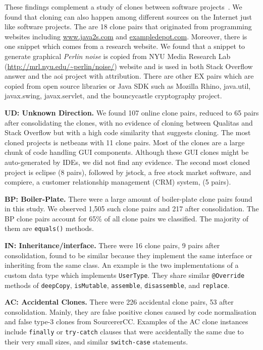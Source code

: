 \documentclass[10pt,journal,compsoc]{IEEEtran}
\begin{document}
These findings complement a study of clones between software
projects~\cite{Svajlenko2014}. We found that cloning can also happen among
different sources on the Internet just like software projects. The are 18 clone
pairs that originated from programming websites including \url{www.java2s.com}
and \url{exampledepot.com}. Moreover, there is one snippet which comes from a
research website. We found that a snippet to generate graphical \textit{Perlin
	noise} is copied from NYU Media Research Lab
(\url{http://mrl.nyu.edu/~perlin/noise/}) website and is used in both Stack Overflow
answer and the \textsf{aoi} project with attribution. There are other EX pairs which
are copied from open source libraries or Java SDK such as \textsf{Mozilla
	Rhino}, \textsf{java.util}, \textsf{javax.swing}, \textsf{javax.servlet}, and
the \textsf{bouncycastle} cryptography project.

\textbf{UD: Unknown Direction.} We found 107 online clone pairs, reduced to 65
pairs after consolidating the clones, with no evidence of cloning between Qualitas
and Stack Overflow but with a high code similarity that suggests cloning. 
The most cloned projects is \textsf{netbeans} with 11 clone pairs. Most of the
clones are a large chunk of code handling GUI components. Although these GUI
clones might be auto-generated by IDEs, we did not find any evidence. The second
most cloned project is \textsf{eclipse} (8 pairs), followed by \textsf{jstock},
a free stock market software, and \textsf{compiere}, a customer
relationship management (CRM) system, (5 pairs).

\textbf{BP: Boiler-Plate.} There were a large amount of boiler-plate clone pairs
found in this study. We observed 1,505 such clone pairs and 217 after
consolidation. The BP clone pairs account for 65\% of all clone pairs we
classified. The majority of them are {\small{\texttt{equals()}}} methods.

\textbf{IN: Inheritance/interface.} There were 16 clone pairs, 9 pairs after
consolidation, found to be similar because they implement the same interface or
inheriting from the same class. An example is the two implementations of a
custom data type which implements {\small\texttt{UserType}}. They share similar
{\small\texttt{@Override}} methods of {\small\texttt{deepCopy}},
{\small\texttt{isMutable}}, {\small\texttt{assemble}},
{\small\texttt{disassemble}}, and {\small\texttt{replace}}.

\textbf{AC: Accidental Clones.} There were 226 accidental clone
pairs, 53 after consolidation. Mainly, they are false positive clones caused by code
normalisation and false type-3 clones from SourcererCC. 
Examples of the AC clone instances include {\small\texttt{finally}} or
{\small\texttt{try-catch}} clauses that were accidentally the same due
to their very small sizes, and similar {\small\texttt{switch-case}}
statements.
\end{document}

